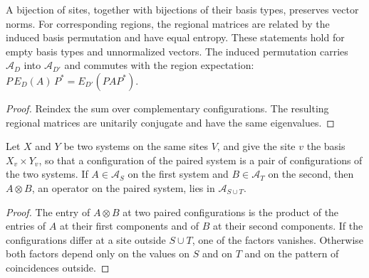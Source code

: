 \begin{lemma}
    \label{lem:sites-regional-relabel}
    \leanok
    A bijection of sites, together with bijections of their basis types,
    preserves vector norms. For corresponding regions, the regional matrices
    are related by the induced basis permutation and have equal entropy.
    These statements hold for empty basis types and unnormalized vectors. The
    induced permutation carries $\mathcal A_D$ into $\mathcal A_{D'}$ and commutes
    with the region expectation: $P\,E_D(A)\,P^*=E_{D'}(PAP^*)$.
\end{lemma}
\begin{proof}
    \leanok
    Reindex the sum over complementary configurations. The resulting regional
    matrices are unitarily conjugate and have the same eigenvalues.
\end{proof}

\begin{lemma}
    \label{lem:sites_paired_product_support}
    \leanok
    Let $X$ and $Y$ be two systems on the same sites $V$, and give the site $v$
    the basis $X_v\times Y_v$, so that a configuration of the paired system is a
    pair of configurations of the two systems. If $A\in\mathcal A_S$ on the first
    system and $B\in\mathcal A_T$ on the second, then $A\otimes B$, an operator on
    the paired system, lies in $\mathcal A_{S\cup T}$.
\end{lemma}
\begin{proof}
    \leanok
    The entry of $A\otimes B$ at two paired configurations is the product of the
    entries of $A$ at their first components and of $B$ at their second
    components. If the configurations differ at a site outside $S\cup T$, one of the
    factors vanishes. Otherwise both factors depend only on the values on $S$ and
    on $T$ and on the pattern of coincidences outside.
\end{proof}

